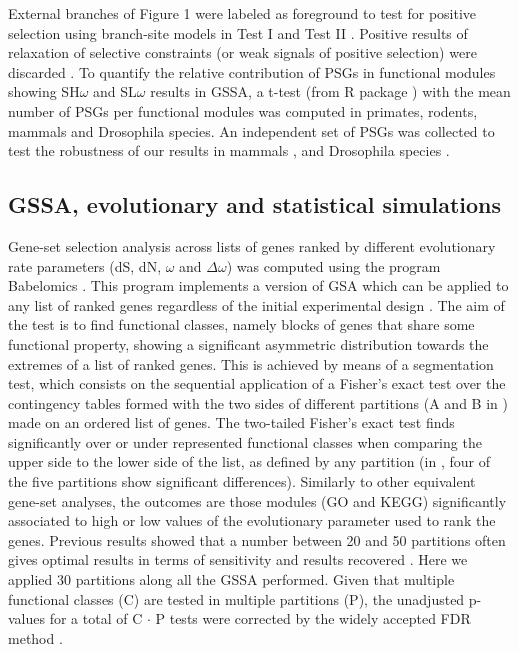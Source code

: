 External branches of Figure 1 were labeled as foreground to test for positive selection using branch-site models in Test I and Test II \cite{Zhang2005}. Positive results of relaxation of selective constraints (or weak signals of positive selection) were discarded \cite{Arbiza2006}. To quantify the relative contribution of PSGs in functional modules showing SH$\omega$ and SL$\omega$ results in GSSA, a t-test (from R package \cite{Ihaka1996}) with the mean number of PSGs per functional modules was computed in primates, rodents, mammals and Drosophila species. An independent set of PSGs was collected to test the robustness of our results in mammals \cite{Kosiol2008a}, and Drosophila species \cite{Clark2007}.

\subsection{GSSA, evolutionary and statistical simulations}

Gene-set selection analysis across lists of genes ranked by different evolutionary rate parameters (dS, dN, $\omega$ and $\Delta\omega$) was computed using the program Babelomics \cite{Al-Shahrour2008}. This program implements a version of GSA \cite{Al-Shahrour2005a} which can be applied to any list of ranked genes regardless of the initial experimental design \cite{Dopazo,Huang2009}. The aim of the test is to find functional classes, namely blocks of genes that share some functional property, showing a significant asymmetric distribution towards the extremes of a list of ranked genes. This is achieved by means of a segmentation test, which consists on the sequential application of a Fisher's exact test over the contingency tables formed with the two sides of different partitions (A and B in ) made on an ordered list of genes. The two-tailed Fisher's exact test finds significantly over or under represented functional classes when comparing the upper side to the lower side of the list, as defined by any partition (in , four of the five partitions show significant differences). Similarly to other equivalent gene-set analyses, the outcomes are those modules (GO and KEGG) significantly associated to high or low values of the evolutionary parameter used to rank the genes. Previous results showed that a number between 20 and 50 partitions often gives optimal results in terms of sensitivity and results recovered \cite{Al-Shahrour2005a}. Here we applied 30 partitions along all the GSSA performed. Given that multiple functional classes (C) are tested in multiple partitions (P), the unadjusted p-values for a total of C $\cdot$ P tests were corrected by the widely accepted FDR method \cite{Benjamini2001}.

